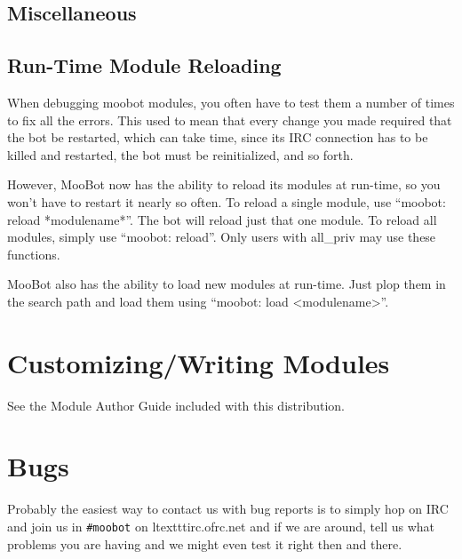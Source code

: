 \documentclass[titlepage]{article}
\begin{document}
	\subsection{Miscellaneous}
		\subsection{Run-Time Module Reloading}
			When debugging moobot modules, you often have to test them
			a number of times to fix all the errors.  This used to mean
			that every change you made required that the bot be restarted,
			which can take time, since its IRC connection has to be killed
			and restarted, the bot must be reinitialized, and so forth.

			However, MooBot now has the ability to reload its modules at
			run-time, so you won't have to restart it nearly so often.
			To reload a single module, use ``moobot: reload *modulename*''.
			The bot will reload just that one module.  To reload all modules,
			simply use ``moobot: reload''.  Only users with all\_priv may
			use these functions.

			MooBot also has the ability to load new modules at run-time.  Just
			plop them in the search path and load them using ``moobot: load
			<modulename>''.

	\section{Customizing/Writing Modules}
		See the Module Author Guide included with this distribution.

	\section{Bugs}
		Probably the easiest way to contact us with bug reports is to simply
		hop on IRC and join us in \texttt{\#moobot} on
		ltexttt{irc.ofrc.net} and if we are around, tell us what
		problems you are having and we might even test it right then and there.
\end{document}

